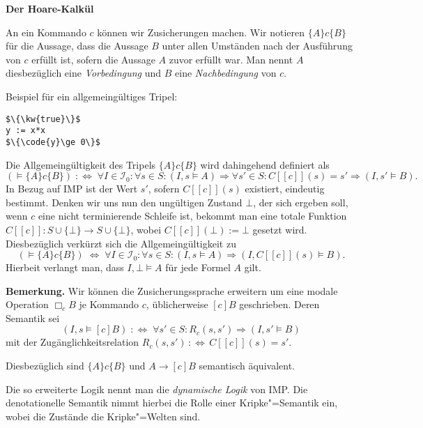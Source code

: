 \documentclass[8pt,fleqn,aspectratio=169]{beamer}
\newcommand{\strong}[1]{\textsf{\textbf{#1}}}
\newcommand{\centerheadline}[1]{%
  \begin{center}\strong{#1}\end{center}}
\newcommand{\parspace}{\vspace{0.8em}}
\newcommand{\kw}[1]{\textbf{\texttt{#1}}}
\newcommand{\code}[1]{\texttt{#1}}
\newcommand{\qb}[1]{[\!\![#1]\!\!]}
\begin{document}
\begin{frame}
\centerheadline{Der Hoare-Kalkül}
\end{frame}

\begin{frame}[fragile]
An ein Kommando $c$ können wir Zusicherungen machen. Wir notieren
$\{A\}c\{B\}$ für die Aussage, dass die Aussage $B$ unter allen Umständen
nach der Ausführung von $c$ erfüllt ist, sofern die Aussage $A$ zuvor
erfüllt war. Man nennt $A$ diesbezüglich eine \emph{Vorbedingung}
und $B$ eine \emph{Nachbedingung} von $c$.\pause

\parspace
Beispiel für ein allgemeingültiges Tripel:
\begin{lstlisting}[language=IMP, xleftmargin=\mathindent, mathescape]
$\{\kw{true}\}$
y := x*x
$\{\code{y}\ge 0\}$
\end{lstlisting}
\end{frame}

\begin{frame}
Die Allgemeingültigkeit des Tripels $\{A\}c\{B\}$ wird dahingehend
definiert als
\[(\models\{A\}c \{B\}) \;:\Leftrightarrow\; \forall I\in\mathcal I_0\colon\forall s\in S\colon
(I,s\models A)\Rightarrow\forall s'\in S\colon C\qb{c}(s)=s'\Rightarrow (I,s'\models B).\]\pause
{\footnotesize In Bezug auf IMP ist der Wert $s'$,
sofern $C\qb{c}(s)$ existiert, eindeutig bestimmt.
Denken wir uns nun den ungültigen Zustand $\bot$, der sich ergeben soll,
wenn $c$ eine nicht terminierende Schleife ist, bekommt man eine totale Funktion
$C\qb{c}\colon S\cup\{\bot\}\to S\cup\{\bot\}$, wobei $C\qb{c}(\bot):=\bot$
gesetzt wird. Diesbezüglich verkürzt sich die Allgemeingültigkeit zu
\[(\models\{A\}c \{B\}) \;\Leftrightarrow\; \forall I\in\mathcal I_0\colon\forall s\in S\colon
(I,s\models A)\Rightarrow (I,C\qb{c}(s)\models B).\]
Hierbeit verlangt man, dass $I,\bot\models A$ für jede Formel $A$ gilt.}
\end{frame}

\begin{frame}
\strong{Bemerkung.}
Wir können die Zusicherungssprache erweitern um eine modale Operation
$\Box_c B$ je Kommando $c$, üblicherweise $[c]B$ geschrieben.\pause{} Deren Semantik sei
\[(I,s\models [c]B) \;:\Leftrightarrow\; \forall s'\in S\colon R_c(s,s')\Rightarrow (I,s'\models B)\]
mit der Zugänglichkeitsrelation $R_c(s,s')\,:\Leftrightarrow\, C\qb{c}(s)=s'$.\pause

\parspace
Diesbezüglich sind $\{A\}c\{B\}$ und $A\to [c]B$ semantisch äquivalent.\pause

\parspace
Die so erweiterte Logik nennt man die \emph{dynamische Logik} von IMP.
Die denotationelle Semantik nimmt hierbei die Rolle einer Kripke"=Semantik
ein, wobei die Zustände die Kripke"=Welten sind.
\end{frame}
\end{document}
